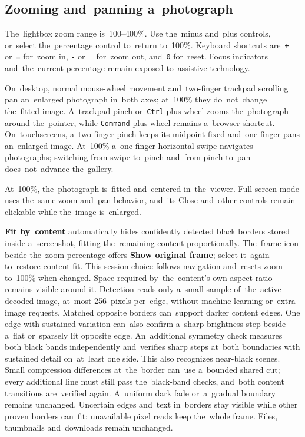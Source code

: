 \documentclass[11pt,a4paper]{article}
\newcommand{\ui}[1]{\textbf{#1}}
\newcommand{\codeword}[1]{\nolinkurl{#1}}
\begin{document}
\subsection{Zooming and~panning a~photograph}

The~lightbox zoom range is~100--400\%. Use the~minus and~plus controls,
or~select the~percentage control to~return to~100\%. Keyboard shortcuts
are~\codeword{+} or~\codeword{=} for~zoom in, \codeword{-} or~\codeword{\_}
for~zoom out, and~\codeword{0} for~reset. Focus indicators and~the~current
percentage remain exposed to~assistive technology.

On~desktop, normal mouse-wheel movement and~two-finger trackpad scrolling pan
an~enlarged photograph in~both axes; at~100\% they do~not~change the~fitted
image. A~trackpad pinch or~\codeword{Ctrl} plus wheel zooms the~photograph
around the~pointer, while \codeword{Command} plus wheel remains a~browser
shortcut. On~touchscreens, a~two-finger pinch keeps its midpoint fixed and~one
finger pans an~enlarged image. At~100\% a~one-finger horizontal swipe navigates
photographs; switching from swipe to~pinch and~from pinch to~pan
does~not~advance the~gallery.

At~100\%, the~photograph is~fitted and~centered in~the~viewer. Full-screen mode
uses the~same zoom and~pan behavior, and~its Close and~other controls remain
clickable while the~image is~enlarged.

\ui{Fit by~content} automatically hides confidently detected black borders
stored inside a~screenshot, fitting the~remaining content proportionally.
The~frame icon beside the~zoom percentage offers \ui{Show original frame};
select it~again to~restore content fit. This session choice follows navigation
and~resets zoom to~100\% when changed. Space required by~the~content's own
aspect ratio remains visible around it.
Detection reads only a~small sample of~the~active decoded image, at~most
256~pixels per~edge, without machine learning or~extra image requests.
Matched opposite borders can~support darker content edges. One edge with
sustained variation can~also confirm a~sharp brightness step beside a~flat
or~sparsely lit opposite edge. An~additional symmetry check measures both black
bands independently and~verifies sharp steps at~both boundaries with sustained
detail on~at~least one side. This also recognizes near-black scenes.
Small compression differences at~the~border can~use a~bounded shared cut;
every additional line must still pass the~black-band checks, and~both content
transitions are~verified again.
A~uniform dark fade or~a~gradual boundary
remains unchanged. Uncertain edges
and~text in~borders stay visible while other proven borders can~fit;
unavailable pixel reads keep the~whole frame. Files, thumbnails and~downloads
remain unchanged.
\end{document}
